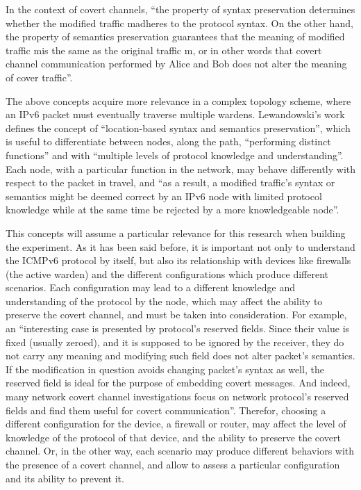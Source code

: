\documentclass[12pt]{article}
\begin{document}
In the context of covert channels, ``the property of syntax preservation determines whether the modified traffic m\textprime\hspace{2pt}adheres to the protocol syntax. On the other hand, the property of semantics preservation guarantees that the meaning of modified traffic m\textprime\hspace{2pt}is the same as the original traffic m, or in other words that covert channel communication performed by Alice and Bob does not alter the meaning of cover traffic''.

The above concepts acquire more relevance in a complex topology scheme, where an IPv6 packet must eventually traverse multiple wardens. Lewandowski's work defines the concept of ``location-based syntax and semantics preservation'', which is useful to differentiate between nodes, along the path, ``performing distinct functions'' and with ``multiple levels of protocol knowledge and understanding''. Each node, with a particular function in the network, may behave differently with respect to the packet in travel, and ``as a result, a modified traffic’s syntax or semantics might be deemed correct by an IPv6 node with limited protocol knowledge while at  the same time be rejected by a more knowledgeable node''.

This concepts will assume a particular relevance for this research when building the experiment. As it has been said before, it is important not only to understand the ICMPv6 protocol by itself, but also its relationship with devices like firewalls (the active warden) and the different configurations which produce different scenarios. Each configuration may lead to a different knowledge and understanding of the protocol by the node, which may affect the ability to preserve the covert channel, and must be taken into consideration. For example, an ``interesting case is presented by protocol’s reserved fields. Since their value is fixed (usually zeroed), and it is supposed to be ignored by the receiver, they do not carry any meaning and modifying such field does not alter packet’s semantics. If the modification in question avoids changing packet’s syntax as well, the reserved field is ideal for the purpose of embedding covert messages. And indeed, many network covert channel investigations focus on network protocol’s reserved fields and find them useful for covert communication''. Therefor, choosing a different configuration for the device, a firewall or router, may affect the level of knowledge of the protocol of that device, and the ability to preserve the covert channel. Or, in the other way, each scenario may produce different behaviors with the presence of a covert channel, and allow to assess a particular configuration and its ability to prevent it.
\end{document}

